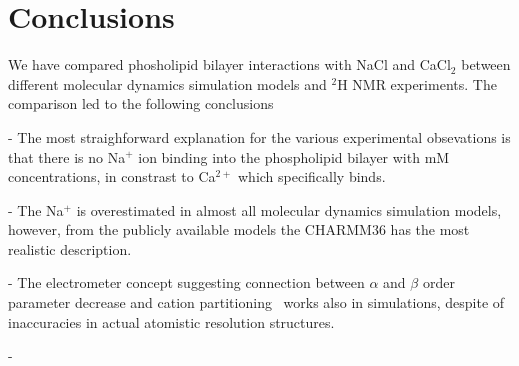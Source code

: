 \documentclass[pre,aps,floatfix,authordate1-4,twocolumn]{revtex4-1}
\begin{document}
\section{Conclusions}
We have compared phosholipid bilayer interactions with NaCl and CaCl$_2$ between different molecular dynamics simulation
models and $^2$H NMR experiments. The comparison led to the following conclusions

- The most straighforward explanation for the various experimental obsevations is that there is no Na$^+$ ion binding
into the phospholipid bilayer with mM concentrations, in constrast to Ca$^{2+}$ which specifically binds.

- The Na$^+$ is overestimated in almost all molecular dynamics simulation models, however, from the publicly available
models the CHARMM36 has the most realistic description.

- The electrometer concept suggesting connection between $\alpha$ and $\beta$ order parameter decrease and
cation partitioning~\cite{akutsu81,altenbach84,seelig87,scherer89} works also in simulations, despite of inaccuracies in actual atomistic resolution structures. 


-  




\end{document}
